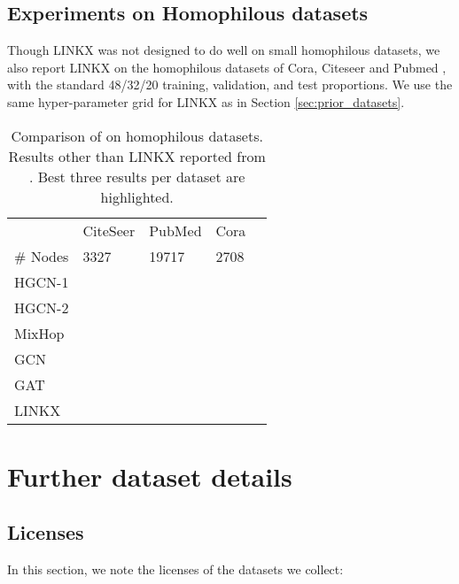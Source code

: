 \documentclass{article}
\newcommand{\bestcell}{\cellcolor{blue!25}}
\begin{document}
\subsection{Experiments on Homophilous datasets} 

Though LINKX was not designed to do well on small homophilous datasets, we also report LINKX on the homophilous datasets of Cora, Citeseer and Pubmed \cite{yang2016revisiting}, with the standard 48/32/20 training, validation, and test proportions. We use the same hyper-parameter grid for LINKX as in Section \ref{sec:prior_datasets}.

\begin{table}[ht]
    \vspace{-5pt}
    \centering
	\caption{Comparison of on homophilous datasets. Results other than LINKX reported from \cite{zhu2020beyond}. Best three results per dataset are highlighted.  } 
\label{tab:homophilous_results}
    {\small
    \begin{tabular}{lllll}
    \toprule
	 & CiteSeer & PubMed & Cora\\
	 \# Nodes & 3327 & 19717 & 2708\\
    \midrule
	 HGCN-1 & \bestcell  & \bestcell  &   \\
	 HGCN-2 &  \bestcell  & \bestcell  & \bestcell \\
	 MixHop &   &   & \bestcell \\ 
	 GCN & \bestcell  &  & \bestcell  \\ 
	 GAT &   &  & \\

	 \midrule
	LINKX &  & \bestcell  &   \\
	 \bottomrule
    \end{tabular}
    }
\end{table}


\section{Further dataset details}\label{sec:further_dataset}

\subsection{Licenses}

In this section, we note the licenses of the datasets we collect: 
\end{document}
